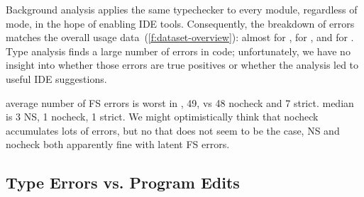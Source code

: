 \documentclass[english,submission,cleveref]{programming}
\begin{document}
Background analysis applies the same typechecker to every module, regardless
of mode, in the hope of enabling IDE tools.
Consequently, the breakdown of \FS{} errors matches the overall usage
data~(\cref{f:dataset-overview}): almost  for \mnocheck{},
 for \mnonstrict{}, and  for \mstrict{}.
Type analysis finds a large number of errors in \mnocheck{} code;
unfortunately, we have no insight into whether those errors are true
positives or whether the analysis led to useful IDE suggestions.

\FILL{} average number of FS errors is
worst in \mnonstrict{}, 49, vs 48 nocheck and 7 strict.
median is 3 NS, 1 nocheck, 1 strict.
We might optimistically think that nocheck accumulates
lots of errors, but no that does not seem to be the case,
NS and nocheck both apparently fine with latent FS errors.


\subsection{Type Errors vs. Program Edits}
\label{s:type-error-survival}
\end{document}
